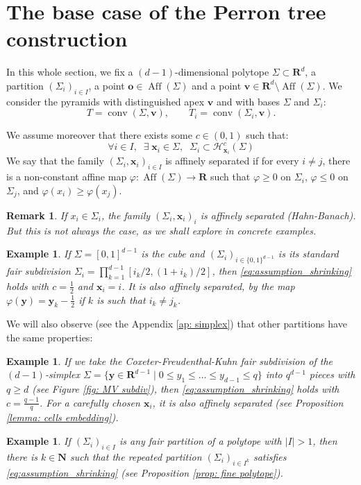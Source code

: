 \documentclass[10pt]{amsart}
\newcommand{\R}{\mathbf{R}}
\newcommand{\N}{\mathbf{N}}
\newcommand{\conv}{\operatorname{conv}}
\newcommand{\aff}{\operatorname{Aff}}
\newtheorem{example}[theorem]{Example}
\newtheorem{remark}[theorem]{Remark}
\begin{document}
\section{The base case of the Perron tree construction}\label{sec: perron base}

In this whole section, we fix a $(d-1)$-dimensional polytope $\Sigma\subset \R^d$, a partition $(\Sigma_i)_{i \in I}$, a point $\mathbf{o}\in\aff(\Sigma)$ and a point $\mathbf{v} \in \R^d \setminus \aff(\Sigma)$. We consider the pyramids with distinguished apex $\mathbf v$ and with bases $\Sigma$ and $\Sigma_i$:
\[ T = \conv(\Sigma,\mathbf{v}),\qquad T_i = \conv(\Sigma_i,\mathbf{v}).\]

We assume moreover that there exists some $c\in (0,1)$ such that:
\begin{equation}\label{eq:assumption_shrinking} 
\boxed{\forall i\in I, \;\; \exists \;\mathbf{x}_i \in \Sigma,\;\;\Sigma_i \subset \mathcal{H}_{\mathbf{x}_i}^c(\Sigma)}
\end{equation}
We say that the family $(\Sigma_i,\mathbf{x}_i)_{i\in I}$ is affinely separated if for every $i \neq j$, there is a non-constant affine map $\varphi:\aff(\Sigma) \to \R$ such that $\varphi \geq 0$ on $\Sigma_i$, $\varphi \leq 0$ on $\Sigma_j$, and $\varphi(x_i)\geq \varphi(x_j)$. 

\begin{remark}
If $x_i \in \Sigma_i$, the family $(\Sigma_i,\mathbf{x}_i)_i$ is affinely separated (Hahn-Banach). But this is not always the case, as we shall explore in concrete examples.
\end{remark}

\begin{example}\label{ex:cubes} If $\Sigma=[0,1]^{d-1}$ is the cube and $(\Sigma_i)_{i \in \{0,1\}^{d-1}}$ is its standard fair subdivision $\Sigma_i = \prod_{k=1}^{d-1} [i_k/2,(1+i_k)/2]$, then \eqref{eq:assumption_shrinking} holds with $c=\frac 1 2$ and $\mathbf{x}_i=i$. It is also affinely separated, by the map $\varphi(\mathbf{y})=\mathbf{y}_k - \frac 1 2$ if $k$ is such that $i_k \neq j_k$.
\end{example}
We will also observe (see the Appendix \ref{ap: simplex}) that other partitions have the same properties:
\begin{example}\label{ex:simplex}
 If we take the Coxeter-Freudenthal-Kuhn fair subdivision of the $(d-1)$-simplex $\Sigma=\{\mathbf{y}\in \R^{d-1}\mid 0\leq y_1\leq \dots\leq y_{d-1}\leq q\}$ into $q^{d-1}$ pieces with $q \geq d$ (see Figure \ref{fig: MV subdiv}), then \eqref{eq:assumption_shrinking} holds with $c=\frac{q-1}{q}$. For a carefully chosen $\mathbf{x}_i$, it is also affinely separated (see Proposition \ref{lemma: cells embedding}).  \end{example}
\begin{example}  If $(\Sigma_i)_{i \in I}$ is any fair partition of a  polytope with $|I|>1$, then there is $k\in \N$ such that the repeated partition $(\Sigma_i)_{i \in I^k}$ satisfies \eqref{eq:assumption_shrinking} (see Proposition \ref{prop: fine polytope}).
\end{example}
\end{document}
